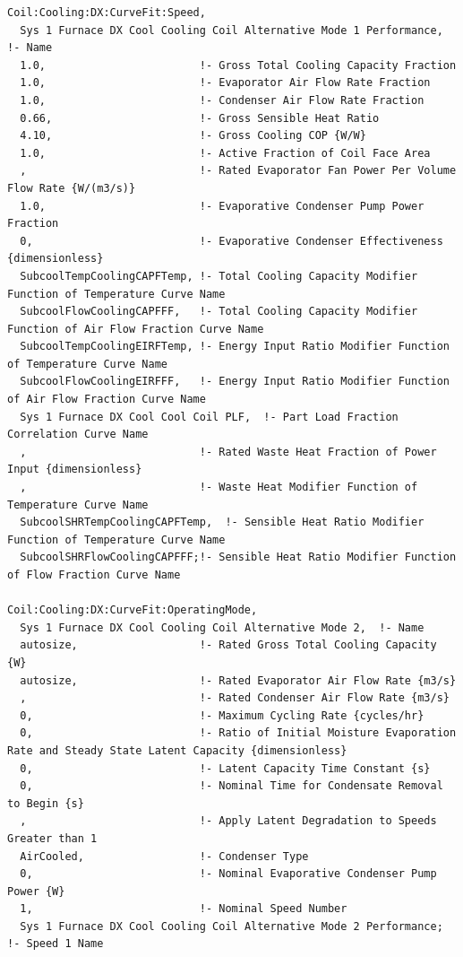 \begin{lstlisting}
Coil:Cooling:DX:CurveFit:Speed,
  Sys 1 Furnace DX Cool Cooling Coil Alternative Mode 1 Performance,  !- Name
  1.0,                        !- Gross Total Cooling Capacity Fraction
  1.0,                        !- Evaporator Air Flow Rate Fraction
  1.0,                        !- Condenser Air Flow Rate Fraction
  0.66,                       !- Gross Sensible Heat Ratio
  4.10,                       !- Gross Cooling COP {W/W}
  1.0,                        !- Active Fraction of Coil Face Area
  ,                           !- Rated Evaporator Fan Power Per Volume Flow Rate {W/(m3/s)}
  1.0,                        !- Evaporative Condenser Pump Power Fraction
  0,                          !- Evaporative Condenser Effectiveness {dimensionless}
  SubcoolTempCoolingCAPFTemp, !- Total Cooling Capacity Modifier Function of Temperature Curve Name
  SubcoolFlowCoolingCAPFFF,   !- Total Cooling Capacity Modifier Function of Air Flow Fraction Curve Name
  SubcoolTempCoolingEIRFTemp, !- Energy Input Ratio Modifier Function of Temperature Curve Name
  SubcoolFlowCoolingEIRFFF,   !- Energy Input Ratio Modifier Function of Air Flow Fraction Curve Name
  Sys 1 Furnace DX Cool Cool Coil PLF,  !- Part Load Fraction Correlation Curve Name
  ,                           !- Rated Waste Heat Fraction of Power Input {dimensionless}
  ,                           !- Waste Heat Modifier Function of Temperature Curve Name
  SubcoolSHRTempCoolingCAPFTemp,  !- Sensible Heat Ratio Modifier Function of Temperature Curve Name
  SubcoolSHRFlowCoolingCAPFFF;!- Sensible Heat Ratio Modifier Function of Flow Fraction Curve Name

Coil:Cooling:DX:CurveFit:OperatingMode,
  Sys 1 Furnace DX Cool Cooling Coil Alternative Mode 2,  !- Name
  autosize,                   !- Rated Gross Total Cooling Capacity {W}
  autosize,                   !- Rated Evaporator Air Flow Rate {m3/s}
  ,                           !- Rated Condenser Air Flow Rate {m3/s}
  0,                          !- Maximum Cycling Rate {cycles/hr}
  0,                          !- Ratio of Initial Moisture Evaporation Rate and Steady State Latent Capacity {dimensionless}
  0,                          !- Latent Capacity Time Constant {s}
  0,                          !- Nominal Time for Condensate Removal to Begin {s}
  ,                           !- Apply Latent Degradation to Speeds Greater than 1
  AirCooled,                  !- Condenser Type
  0,                          !- Nominal Evaporative Condenser Pump Power {W}
  1,                          !- Nominal Speed Number
  Sys 1 Furnace DX Cool Cooling Coil Alternative Mode 2 Performance;  !- Speed 1 Name


\end{lstlisting}
